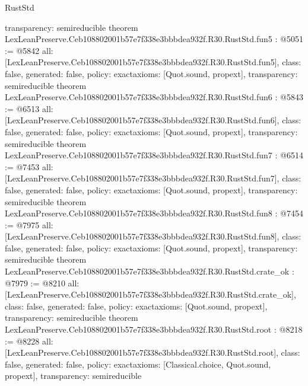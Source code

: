 \begin{lexlean}{RustStd}
\begin{coremodule}
{  transparency: semireducible
}
theorem LexLeanPreserve.Ceb108802001b57e7f338e3bbbdea932f.R30.RustStd.fun5 : @5051 := @5842 {
  all: [LexLeanPreserve.Ceb108802001b57e7f338e3bbbdea932f.R30.RustStd.fun5],
  class: false,
  generated: false,
  policy: exact{axioms: [Quot.sound, propext]},
  transparency: semireducible
}
theorem LexLeanPreserve.Ceb108802001b57e7f338e3bbbdea932f.R30.RustStd.fun6 : @5843 := @6513 {
  all: [LexLeanPreserve.Ceb108802001b57e7f338e3bbbdea932f.R30.RustStd.fun6],
  class: false,
  generated: false,
  policy: exact{axioms: [Quot.sound, propext]},
  transparency: semireducible
}
theorem LexLeanPreserve.Ceb108802001b57e7f338e3bbbdea932f.R30.RustStd.fun7 : @6514 := @7453 {
  all: [LexLeanPreserve.Ceb108802001b57e7f338e3bbbdea932f.R30.RustStd.fun7],
  class: false,
  generated: false,
  policy: exact{axioms: [Quot.sound, propext]},
  transparency: semireducible
}
theorem LexLeanPreserve.Ceb108802001b57e7f338e3bbbdea932f.R30.RustStd.fun8 : @7454 := @7975 {
  all: [LexLeanPreserve.Ceb108802001b57e7f338e3bbbdea932f.R30.RustStd.fun8],
  class: false,
  generated: false,
  policy: exact{axioms: [Quot.sound, propext]},
  transparency: semireducible
}
theorem LexLeanPreserve.Ceb108802001b57e7f338e3bbbdea932f.R30.RustStd.crate_ok : @7979 := @8210 {
  all: [LexLeanPreserve.Ceb108802001b57e7f338e3bbbdea932f.R30.RustStd.crate_ok],
  class: false,
  generated: false,
  policy: exact{axioms: [Quot.sound, propext]},
  transparency: semireducible
}
theorem LexLeanPreserve.Ceb108802001b57e7f338e3bbbdea932f.R30.RustStd.root : @8218 := @8228 {
  all: [LexLeanPreserve.Ceb108802001b57e7f338e3bbbdea932f.R30.RustStd.root],
  class: false,
  generated: false,
  policy: exact{axioms: [Classical.choice, Quot.sound, propext]},
  transparency: semireducible
}


\end{coremodule}
\end{lexlean}
